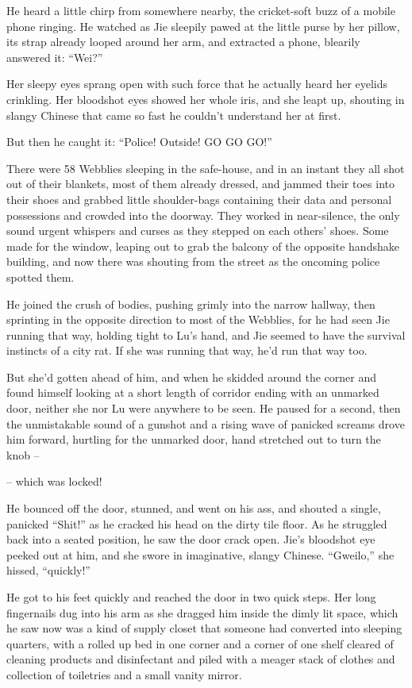 He heard a little chirp from somewhere nearby, the cricket-soft
buzz of a mobile phone ringing. He watched as Jie sleepily pawed at
the little purse by her pillow, its strap already looped around her
arm, and extracted a phone, blearily answered it: ``Wei?''

Her sleepy eyes sprang open with such force that he actually heard
her eyelids crinkling. Her bloodshot eyes showed her whole iris,
and she leapt up, shouting in slangy Chinese that came so fast he
couldn't understand her at first.

But then he caught it: ``Police! Outside! GO GO GO!''

There were 58 Webblies sleeping in the safe-house, and in an
instant they all shot out of their blankets, most of them already
dressed, and jammed their toes into their shoes and grabbed little
shoulder-bags containing their data and personal possessions and
crowded into the doorway. They worked in near-silence, the only
sound urgent whispers and curses as they stepped on each others'
shoes. Some made for the window, leaping out to grab the balcony of
the opposite handshake building, and now there was shouting from
the street as the oncoming police spotted them.

He joined the crush of bodies, pushing grimly into the narrow
hallway, then sprinting in the opposite direction to most of the
Webblies, for he had seen Jie running that way, holding tight to
Lu's hand, and Jie seemed to have the survival instincts of a city
rat. If she was running that way, he'd run that way too.

But she'd gotten ahead of him, and when he skidded around the
corner and found himself looking at a short length of corridor
ending with an unmarked door, neither she nor Lu were anywhere to
be seen. He paused for a second, then the unmistakable sound of a
gunshot and a rising wave of panicked screams drove him forward,
hurtling for the unmarked door, hand stretched out to turn the knob
--

-- which was locked!

He bounced off the door, stunned, and went on his ass, and shouted
a single, panicked ``Shit!'' as he cracked his head on the dirty tile
floor. As he struggled back into a seated position, he saw the door
crack open. Jie's bloodshot eye peeked out at him, and she swore in
imaginative, slangy Chinese. ``Gweilo,'' she hissed, ``quickly!''

He got to his feet quickly and reached the door in two quick steps.
Her long fingernails dug into his arm as she dragged him inside the
dimly lit space, which he saw now was a kind of supply closet that
someone had converted into sleeping quarters, with a rolled up bed
in one corner and a corner of one shelf cleared of cleaning
products and disinfectant and piled with a meager stack of clothes
and collection of toiletries and a small vanity mirror.


